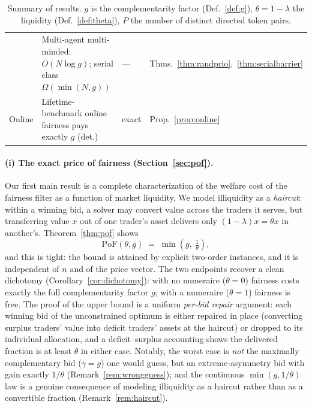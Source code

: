 \documentclass[11pt]{article}
\theoremstyle{remark}
\newcommand{\PoF}{\mathrm{PoF}}
\begin{document}
\begin{table}[t]
\begin{tabular}{@{}llll@{}}
 & Multi-agent multi-minded: $O(N\log g)$; serial class $\Omega(\min(N,g))$ & --- & Thms.~\ref{thm:randprio},~\ref{thm:serialbarrier} \\
Online & Lifetime-benchmark online fairness pays exactly $g$ (det.) & exact & Prop.~\ref{prop:online} \\
\bottomrule
\end{tabular}
\caption{Summary of results. $g$ is the complementarity factor
(Def.~\ref{def:g}), $\theta=1-\lambda$ the liquidity (Def.~\ref{def:theta}),
$P$ the number of distinct directed token pairs.}
\label{tab:results}
\end{table}

\paragraph{(i) The exact price of fairness (Section~\ref{sec:pof}).}
Our first main result is a complete characterization of the welfare cost of
the fairness filter as a function of market liquidity. We model illiquidity
as a \emph{haircut}: within a winning bid, a solver may convert value across
the traders it serves, but transferring value $x$ out of one trader's asset
delivers only $(1-\lambda)x=\theta x$ in another's.
Theorem~\ref{thm:pof} shows
\[
\PoF(\theta,g) \;=\; \min\!\left(g,\ \tfrac1\theta\right),
\]
and this is tight: the bound is attained by explicit two-order instances,
and it is independent of $n$ and of the price vector. The two endpoints
recover a clean dichotomy (Corollary~\ref{cor:dichotomy}): with no numeraire
($\theta=0$) fairness costs exactly the full complementarity factor $g$;
with a numeraire ($\theta=1$) fairness is free. The proof of the upper bound
is a uniform \emph{per-bid repair} argument: each winning bid of the
unconstrained optimum is either repaired in place (converting surplus
traders' value into deficit traders' assets at the haircut) or dropped to
its individual allocation, and a deficit--surplus accounting shows the
delivered fraction is at least $\theta$ in either case. Notably, the
worst case is \emph{not} the maximally complementary bid ($\gamma=g$) one
would guess, but an extreme-asymmetry bid with gain exactly $1/\theta$
(Remark~\ref{rem:wrongguess}); and the continuous $\min(g,1/\theta)$ law is
a genuine consequence of modeling illiquidity as a haircut rather than as a
convertible fraction (Remark~\ref{rem:haircut}).
\end{document}
